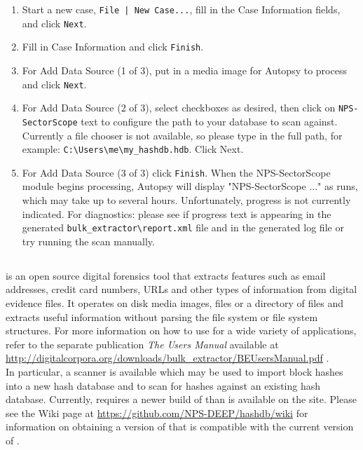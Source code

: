\documentclass[11pt,fleqn]{article} %
\begin{document}
\begin{enumerate}
\item Start a new case, \verb+File | New Case...+, fill in the Case Information fields, and click \verb+Next+.
\item Fill in Case Information and click \verb+Finish+.
\item For Add Data Source (1 of 3), put in a media image for Autopsy to process and click \verb+Next+.
\item For Add Data Source (2 of 3), select checkboxes as desired, then click on \verb+NPS-SectorScope+ text to configure the path to your \hdb database to scan against. Currently a file chooser is not available, so please type in the full path, for example: \verb+C:\Users\me\my_hashdb.hdb+. Click Next.
\item For Add Data Source (3 of 3) click \verb+Finish+. When the NPS-SectorScope module begins processing, Autopsy will display "NPS-SectorScope ..." as \bulk runs, which may take up to several hours. Unfortunately, \bulk progress is not currently indicated. For diagnostics: please see if progress text is appearing in the generated \verb+bulk_extractor\report.xml+ file and in the generated log file or try running the scan manually.
\end{enumerate}

\subsection{\bulk}
\bulk is an open source digital forensics tool that extracts features such as email addresses, credit card numbers, URLs and other types of information from digital evidence files. It operates on disk media images, files or a directory of files and extracts useful information without parsing the file system or file system structures.  For more information on how to use \bulk for a wide variety of applications, refer to the separate publication \textit{The \bulk Users Manual} available at \url{http://digitalcorpora.org/downloads/bulk_extractor/BEUsersManual.pdf} \cite{beusersguide}.\\

In particular, a \hdb \bulk scanner is available which may be used to import block hashes into a new hash database and to scan for hashes against an existing hash database.
Currently, \hdb requires a newer build of \bulk than is available on the \bulk site.
Please see the \hdb Wiki page at \url{https://github.com/NPS-DEEP/hashdb/wiki}
for information on obtaining a version of \bulk that is compatible with the current version of \hdb.\\
\end{document}
